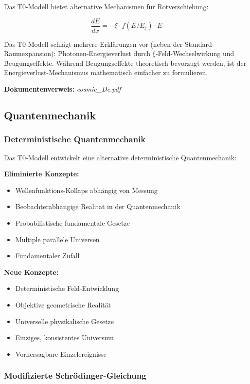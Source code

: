 \documentclass[12pt,a4paper]{article}
\newcommand{\xipar}{\xi}
\begin{document}
	Das T0-Modell bietet alternative Mechanismen für Rotverschiebung:
	
	\begin{equation}
		\frac{dE}{dx} = -\xipar \cdot f(E/E_\xipar) \cdot E
	\end{equation}
	
	Das T0-Modell schlägt mehrere Erklärungen vor (neben der Standard-Raumexpansion): Photonen-Energieverlust durch $\xipar$-Feld-Wechselwirkung und Beugungseffekte. Während Beugungseffekte theoretisch bevorzugt werden, ist der Energieverlust-Mechanismus mathematisch einfacher zu formulieren.
	
	\textbf{Dokumentenverweis:} \textit{cosmic\_De.pdf}
	
	\subsection{Quantenmechanik}
	
	\subsubsection{Deterministische Quantenmechanik}
	
	Das T0-Modell entwickelt eine alternative deterministische Quantenmechanik:
	
	\textbf{Eliminierte Konzepte:}
	\begin{itemize}
		\item Wellenfunktions-Kollaps abhängig von Messung
		\item Beobachterabhängige Realität in der Quantenmechanik
		\item Probabilistische fundamentale Gesetze
		\item Multiple parallele Universen
		\item Fundamentaler Zufall
	\end{itemize}
	
	\textbf{Neue Konzepte:}
	\begin{itemize}
		\item Deterministische Feld-Entwicklung
		\item Objektive geometrische Realität
		\item Universelle physikalische Gesetze
		\item Einziges, konsistentes Universum
		\item Vorhersagbare Einzelereignisse
	\end{itemize}
	
	\subsubsection{Modifizierte Schrödinger-Gleichung}
	
\end{document}
